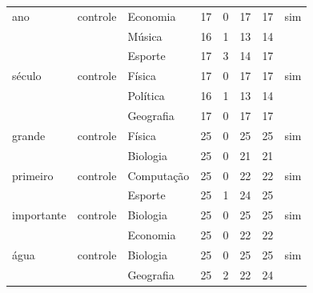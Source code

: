 \begin{tabular}{lllrrrrl}
\midrule
ano & controle & Economia & 17 & 0 & 17 & 17 & sim \\
 &  & Música & 16 & 1 & 13 & 14 &  \\
 &  & Esporte & 17 & 3 & 14 & 17 &  \\
século & controle & Física & 17 & 0 & 17 & 17 & sim \\
 &  & Política & 16 & 1 & 13 & 14 &  \\
 &  & Geografia & 17 & 0 & 17 & 17 &  \\
grande & controle & Física & 25 & 0 & 25 & 25 & sim \\
 &  & Biologia & 25 & 0 & 21 & 21 &  \\
primeiro & controle & Computação & 25 & 0 & 22 & 22 & sim \\
 &  & Esporte & 25 & 1 & 24 & 25 &  \\
importante & controle & Biologia & 25 & 0 & 25 & 25 & sim \\
 &  & Economia & 25 & 0 & 22 & 22 &  \\
água & controle & Biologia & 25 & 0 & 25 & 25 & sim \\
 &  & Geografia & 25 & 2 & 22 & 24 &  \\
\bottomrule
\end{tabular}

\par{}
